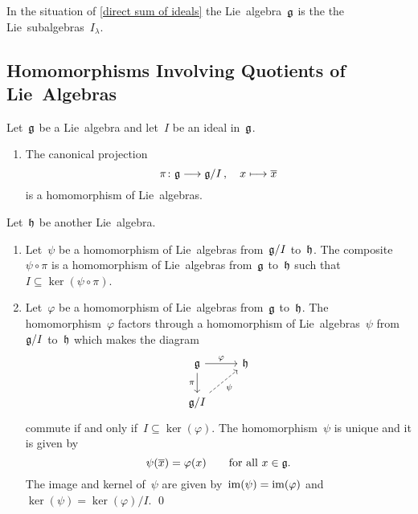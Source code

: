 \begin{definition}
  In the situation of \cref{direct sum of ideals} the Lie~algebra~$\mathfrak{g}$ is the  the Lie~subalgebras~$I_\lambda$.
\end{definition}


\subsection{Homomorphisms Involving Quotients of Lie~Algebras}


\begin{theorem}
  Let~$\mathfrak{g}$ be a Lie~algebra and let~$I$ be an ideal in~$\mathfrak{g}$.
  \begin{enumerate}
    \item
      The canonical projection
      \[
        \pi
        \colon
        \glie
        \to
        \glie/I \,,
        \quad
        x
        \mapsto
        \class{x}
      \]
      is a homomorphism of Lie~algebras.
  \end{enumerate}
  Let~$\mathfrak{h}$ be another Lie~algebra.
  \begin{enumerate}[resume*]
    \item
      Let~$\psi$ be a homomorphism of Lie~algebras from~$\mathfrak{g}/I$ to~$\mathfrak{h}$.
      The composite~$\psi \circ \pi$ is a homomorphism of Lie~algebras from~$\mathfrak{g}$ to~$\mathfrak{h}$ such that~$I \subseteq \ker(\psi \circ \pi)$.
    \item
      Let~$\varphi$ be a homomorphism of Lie~algebras from~$\mathfrak{g}$ to~$\mathfrak{h}$.
      The homomorphism~$\varphi$ factors through a homomorphism of Lie~algebras~$\psi$ from~$\mathfrak{g}/I$ to~$\mathfrak{h}$ which makes the diagram
      \[
        \begin{tikzcd}
          \glie
          \arrow{r}[above]{\varphi}
          \arrow{d}[left]{\pi}
          &
          \hlie
          \\
          \glie/I
          \arrow[dashed]{ur}[below right]{\psi}
          &
          {}
        \end{tikzcd}
      \]
      commute if and only if~$I \subseteq \ker(\varphi)$.
      The homomorphism~$\psi$ is unique and it is given by
      \[
        \psi( \overline{x} )
        =
        \varphi(x)
        \qquad
        \text{for all~$x \in \mathfrak{g}$.}
      \]
      The image and kernel of~$\psi$ are given by~$\operatorname{im}(\psi) = \operatorname{im}(\varphi)$ and~$\ker(\psi) = \ker(\varphi)/I$.
    \qed
  \end{enumerate}
\end{theorem}



